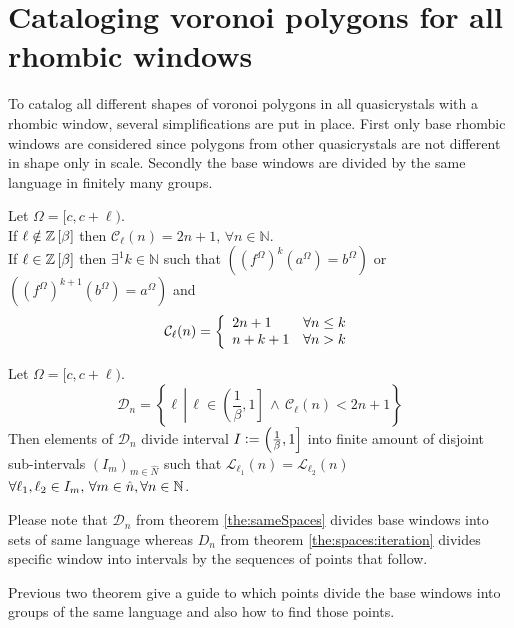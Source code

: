 \documentclass[text.tex]{subfiles}
\begin{document}
\section{Cataloging voronoi polygons for all rhombic windows}

To catalog all different shapes of voronoi polygons in all quasicrystals with a rhombic window, several simplifications are put in place.
First only base rhombic windows are considered since polygons from other quasicrystals are not different in shape only in scale. Secondly the base windows are divided by the same language in finitely many groups. 

\begin{theorem}
\label{the:complexity}
Let $\Omega = [c,c+\ell)$.\\
If $\ell \notin \mathbb{Z}\left[\beta\right]$ then $\mathcal{C}_{\ell}(n) = 2n+1,\, \forall n\in\mathbb{N}$. \\
If $\ell \in \mathbb{Z}\left[\beta\right]$ then $\exists^1 k \in \mathbb{N}$ such that $\left({(f^\Omega)}^{k}(a^\Omega) = b^\Omega\right)$ or $\left({(f^\Omega)}^{k+1}(b^\Omega) = a^\Omega\right)$ and 
$$\mathcal{C}_{\ell}(n) = \left\{
	\begin{array}{l l}
		2n+1	&	\forall n\leq k \\
		n+k+1	&	\forall n > k
	\end{array}
	\right.
$$
\end{theorem}

\begin{theorem}
\label{the:sameSpaces}
Let $\Omega = [c,c+\ell)$.
$$\mathcal{D}_n = \left\{ \ell\,\left|\, \ell\in \left(\frac{1}{\beta},1\right] \,\wedge\, \mathcal{C}_\ell(n) < 2n+1 \right.\right\}$$
Then elements of $\mathcal{D}_n$ divide interval $I \vcentcolon= \left(\frac{1}{\beta},1\right]$ into finite amount of disjoint sub-intervals $(I_m)_{m\in\hat{N}}$ such that $\mathcal{L}_{\ell_1}(n) = \mathcal{L}_{\ell_2}(n)$ $\forall \ell_1, \ell_2 \in I_m,\, \forall m\in\hat{n}, \forall n\in\mathbb{N}$.
\end{theorem}

\begin{remark}
Please note that $\mathcal{D}_n$ from theorem \ref{the:sameSpaces} divides base windows into sets of same language whereas $D_n$ from theorem \ref{the:spaces:iteration} divides specific window into intervals by the sequences of points that follow.
\end{remark}

Previous two theorem give a guide to which points divide the base windows into groups of the same language and also how to find those points. 
\end{document}

